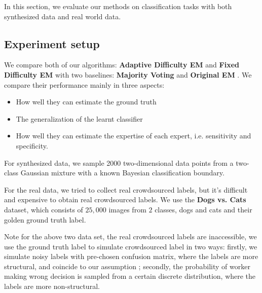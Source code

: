 In this section, we evaluate our methods on classification tasks with both synthesized data and real world data.

\subsection{Experiment setup}

We compare both of our algorithms: \textbf{Adaptive Difficulty EM} and \textbf{Fixed Difficulty EM} with two baselines: \textbf{Majority Voting} and \textbf{Original EM} \cite{raykar2010learning}.   We compare their performance mainly in three aspects: 
\begin{itemize}
    \item How well they can estimate the ground truth
    \item The generalization of the learnt classifier
    \item How well they can estimate the expertise of each expert, i.e. sensitivity and specificity.
\end{itemize}


For synthesized data, we sample 2000 two-dimensional data points from a two-class Gaussian mixture with a known Bayesian classification boundary.


For the real data, we tried to collect real crowdsourced labels, but it's  difficult and expensive to obtain real crowdsourced labels. We use the \textbf{Dogs vs. Cats} \citep{kaggle2013} dataset, which consists of $25,000$ images from $2$ classes, dogs and cats and their golden ground truth label.

Note for the above two data set, the real crowdsourced labels are inaccessible, we use the ground truth label to simulate crowdsourced label in two ways: firstly, we simulate noisy labels with pre-chosen confusion matrix, where the labels are more structural, and coincide to our assumption ; secondly, the probability of worker making wrong decision is sampled from a certain discrete distribution, where the labels are more non-structural.

